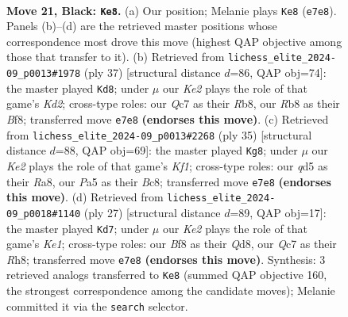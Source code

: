 \documentclass[11pt]{article}
\begin{document}
\clearpage

\begin{figure}[p]\centering
\begin{subfigure}{0.46\textwidth}\centering
\resizebox{\linewidth}{!}{%
\newchessgame
\chessboard[
  setfen={1rb2b1r/2q1k1pp/1p6/p2Qp1B1/3p3P/8/PP3PP1/RN2R1K1 b - - 5 21},
  showmover=false,
  pgfstyle=straightmove, color=movearrow, markmove={e7-e8}
]}
\caption{}
\end{subfigure}\hfill
\begin{subfigure}{0.46\textwidth}\centering
\resizebox{\linewidth}{!}{%
\newchessgame
\chessboard[
  setfen={1r3b1r/pp1kqpp1/3p3p/NQ1Pp3/7P/2R5/PPP2PP1/R3K3 b Q - 11 19},
  showmover=false,
  pgfstyle=straightmove, color=movearrow, markmove={d7-d8}
]}
\caption{}
\end{subfigure}
\\[4pt]
\begin{subfigure}{0.46\textwidth}\centering
\resizebox{\linewidth}{!}{%
\newchessgame
\chessboard[
  setfen={r1b2k1r/p1q1pp1p/1p4pQ/1BnRN3/8/8/PPP2PPP/1K5R b - - 1 18},
  showmover=false,
  pgfstyle=straightmove, color=movearrow, markmove={f8-g8}
]}
\caption{}
\end{subfigure}\hfill
\begin{subfigure}{0.46\textwidth}\centering
\resizebox{\linewidth}{!}{%
\newchessgame
\chessboard[
  setfen={r2qk2r/ppp1b1Qp/1n1pp3/1P6/5P2/8/1PP3PP/RNB2RK1 b kq - 0 14},
  showmover=false,
  pgfstyle=straightmove, color=movearrow, markmove={e8-d7}
]}
\caption{}
\end{subfigure}
\caption{\textbf{Move 21, Black: \texttt{Ke8}.} (a) Our position; Melanie plays \texttt{Ke8} (\texttt{e7e8}). Panels (b)--(d) are the retrieved master positions whose correspondence most drove this move (highest QAP objective among those that transfer to it). (b) Retrieved from \texttt{lichess\_elite\_2024-09\_p0013\#1978} (ply 37) [structural distance $d$=86, QAP obj=74]: the master played \texttt{Kd8}; under $\mu$ our \emph{Ke2} plays the role of that game's \emph{Kd2}; cross-type roles: our \emph{Q}c7 as their \emph{R}b8, our \emph{R}b8 as their \emph{B}f8; transferred move \texttt{e7e8} \textbf{(endorses this move)}. (c) Retrieved from \texttt{lichess\_elite\_2024-09\_p0013\#2268} (ply 35) [structural distance $d$=88, QAP obj=69]: the master played \texttt{Kg8}; under $\mu$ our \emph{Ke2} plays the role of that game's \emph{Kf1}; cross-type roles: our \emph{q}d5 as their \emph{R}a8, our \emph{P}a5 as their \emph{B}c8; transferred move \texttt{e7e8} \textbf{(endorses this move)}. (d) Retrieved from \texttt{lichess\_elite\_2024-09\_p0018\#1140} (ply 27) [structural distance $d$=89, QAP obj=17]: the master played \texttt{Kd7}; under $\mu$ our \emph{Ke2} plays the role of that game's \emph{Ke1}; cross-type roles: our \emph{B}f8 as their \emph{Q}d8, our \emph{Q}c7 as their \emph{R}h8; transferred move \texttt{e7e8} \textbf{(endorses this move)}. Synthesis: 3 retrieved analogs transferred to \texttt{Ke8} (summed QAP objective 160, the strongest correspondence among the candidate moves); Melanie committed it via the \texttt{search} selector.}
\label{fig:thought-m41}
\end{figure}
\end{document}
